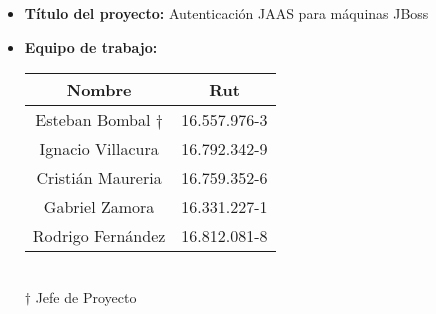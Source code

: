 \begin{itemize}
	\item \textbf{Título del proyecto:} Autenticación JAAS para máquinas JBoss

	\item \textbf{Equipo de trabajo:}\\
	\begin{center}
		\renewcommand{\arraystretch}{2}
		\begin{tabular}{|c|c|}
		\hline
		\textbf{Nombre} & \textbf{Rut}\\
		\hline
		Esteban Bombal $\dagger$& 16.557.976-3\\
		\hline
		Ignacio Villacura & 16.792.342-9\\
		\hline
		Cristián Maureria & 16.759.352-6\\
		\hline
		Gabriel Zamora	& 16.331.227-1\\
		\hline
		Rodrigo Fernández  &  16.812.081-8\\
		\hline
		\end{tabular}
		\\
		\vspace{0.5cm}
	\small $\dagger$ Jefe de Proyecto
	\end{center}
\end{itemize}
